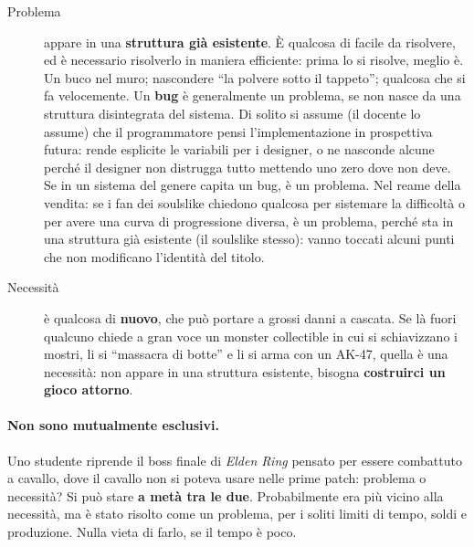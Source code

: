 \begin{description}
  \item[Problema] appare in una \textbf{struttura già esistente}. È qualcosa
        di facile da risolvere, ed è necessario risolverlo in maniera
        efficiente: prima lo si risolve, meglio è. Un buco nel muro; nascondere
        ``la polvere sotto il tappeto''; qualcosa che si fa velocemente. Un
        \textbf{bug} è generalmente un problema, se non nasce da una struttura
        disintegrata del sistema. Di solito si assume (il docente lo assume)
        che il programmatore pensi l'implementazione in prospettiva futura:
        rende esplicite le variabili per i designer, o ne nasconde alcune
        perché il designer non distrugga tutto mettendo uno zero dove non
        deve. Se in un sistema del genere capita un bug, è un problema. Nel
        reame della vendita: se i fan dei soulslike chiedono qualcosa per
        sistemare la difficoltà o per avere una curva di progressione diversa,
        è un problema, perché sta in una struttura già esistente (il soulslike
        stesso): vanno toccati alcuni punti che non modificano l'identità del
        titolo.
  \item[Necessità] è qualcosa di \textbf{nuovo}, che può portare a grossi
        danni a cascata. Se là fuori qualcuno chiede a gran voce un monster
        collectible in cui si schiavizzano i mostri, li si ``massacra di
        botte'' e li si arma con un AK-47, quella è una necessità: non appare
        in una struttura esistente, bisogna \textbf{costruirci un gioco
        attorno}.
\end{description}

\paragraph{Non sono mutualmente esclusivi.} Uno studente riprende il boss
finale di \emph{Elden Ring} pensato per essere combattuto a cavallo, dove il
cavallo non si poteva usare nelle prime patch: problema o necessità? Si può stare \textbf{a metà tra le due}. Probabilmente era più vicino alla necessità, ma è
stato risolto come un problema, per i soliti limiti di tempo, soldi e
produzione. Nulla vieta di farlo, se il tempo è poco.

